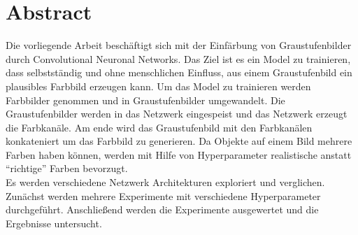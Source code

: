\chapter*{Abstract}
Die vorliegende Arbeit beschäftigt sich mit der Einfärbung von Graustufenbilder durch Convolutional Neuronal Networks.
Das Ziel ist es ein Model zu trainieren, dass selbstständig und ohne menschlichen Einfluss, aus einem Graustufenbild ein plausibles Farbbild erzeugen kann.
Um das Model zu trainieren werden Farbbilder genommen und in Graustufenbilder umgewandelt. Die Graustufenbilder werden in das Netzwerk eingespeist und das Netzwerk erzeugt die
Farbkanäle. Am ende wird das Graustufenbild mit den Farbkanälen konkateniert um das Farbbild zu generieren. Da Objekte auf einem Bild mehrere Farben haben können, werden mit Hilfe
von Hyperparameter realistische anstatt ``richtige'' Farben bevorzugt.
\\
Es werden verschiedene Netzwerk Architekturen exploriert und verglichen. Zunächst werden mehrere Experimente mit verschiedene Hyperparameter durchgeführt.
Anschließend werden die Experimente ausgewertet und die Ergebnisse untersucht.